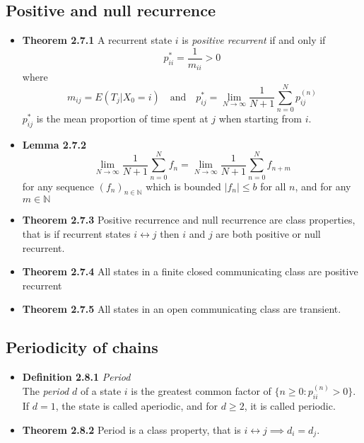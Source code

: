 \documentclass[11pt,a4paper]{article}
\begin{document}
\subsection{Positive and null recurrence}

\begin{itemize}

    \item \textbf{Theorem 2.7.1} A recurrent state $i$ is \emph{positive recurrent} if and only if
        \[
            p_{ii}^* = \frac{1}{m_{ii}} > 0
        \]
        where
        \[
            m_{ij} = E(T_j | X_0 = i) \quad \text{and} \quad p_{ij}^* = \lim_{N \to \infty}
            \frac{1}{N+1} \sum_{n=0}^N p_{ij}^{(n)}
        \]
        $p_{ij}^*$ is the mean proportion of time spent at $j$ when starting from $i$.

    \item \textbf{Lemma 2.7.2} \\
        \[
            \lim_{N \to \infty} \frac{1}{N+1} \sum_{n=0}^N f_n = \lim_{N\to \infty}
            \frac{1}{N+1} \sum_{n=0}^N f_{n+m}
        \]
        for any sequence ${(f_n)}_{n \in \mathbb{N}}$ which is bounded $|f_n| \leq b$ for all $n$,
        and for any $m \in \mathbb{N}$


    \item \textbf{Theorem 2.7.3}
        Positive recurrence and null recurrence are class properties, that is if recurrent states
        $i \leftrightarrow j$ then $i$ and $j$ are both positive or null recurrent.

    \item \textbf{Theorem 2.7.4}
        All states in a finite closed communicating class are positive recurrent

    \item \textbf{Theorem 2.7.5} All states in an open communicating class are transient.

\end{itemize}

\subsection{Periodicity of chains}

\begin{itemize}

    \item \textbf{Definition 2.8.1} \emph{Period} \\
        The \emph{period} $d$ of a state $i$ is the greatest common factor of
        $\{ n \geq 0 : p_{ii}^{(n)} > 0 \}$.
        If $d=1$, the state is called aperiodic, and for $d \geq 2$, it is called periodic.

    \item \textbf{Theorem 2.8.2} Period is a class property, that is
        $i \leftrightarrow j \implies d_i = d_j$.

\end{itemize}
\end{document}

